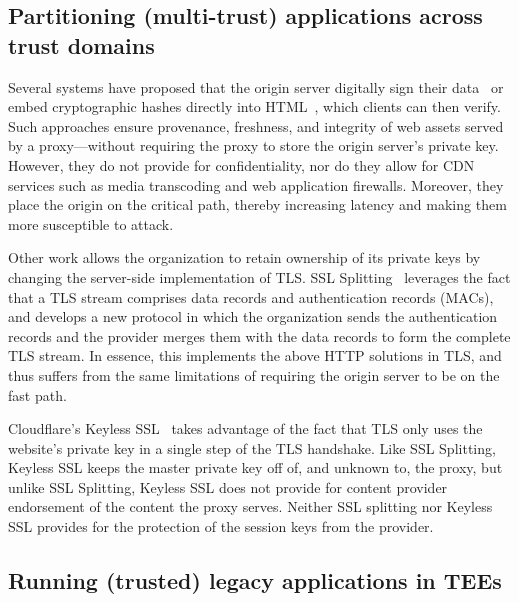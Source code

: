 \subsection{Partitioning (multi-trust) applications across trust domains} 

%
Several systems have proposed that the origin server digitally
sign their data~\cite{cdn-on-demand,stickler} or embed cryptographic hashes
directly into
HTML~\cite{w3c-subresource-integrity,w3c-content-security-policy}, which
clients can then verify.
%
Such approaches ensure provenance, freshness, and integrity of web assets
served by a proxy---without requiring the proxy to store the origin server's
private key.
%
However, they do not provide for confidentiality, nor do they allow for CDN
services such as media transcoding and web application firewalls.
%
Moreover, they place the origin on the critical path, thereby increasing
latency and making them more susceptible to attack.


%
Other work allows the organization to retain ownership of its private keys by
changing the server-side implementation of TLS.
%
SSL Splitting~\cite{ssl-splitting} leverages the fact that a TLS stream
comprises data records and authentication records (MACs), and develops a new
protocol in which the organization sends the authentication records and the
provider merges them with the data records to form the complete TLS stream.
%
In essence, this implements the above HTTP solutions in TLS, and thus suffers
from the same limitations of requiring the origin server to be on the fast
path.

Cloudflare's Keyless SSL~\cite{keyless-ssl} takes advantage of the fact that
TLS only uses the website's private key in a single step of the TLS handshake.
%
Like SSL Splitting, Keyless SSL keeps the master private key off of, and unknown
to, the proxy, but unlike SSL Splitting, Keyless SSL does not provide for
content provider endorsement of the content the proxy serves.  
%
Neither SSL splitting nor Keyless SSL provides for the protection of the
session keys from the provider.


\subsection{Running (trusted) legacy applications in TEEs}

